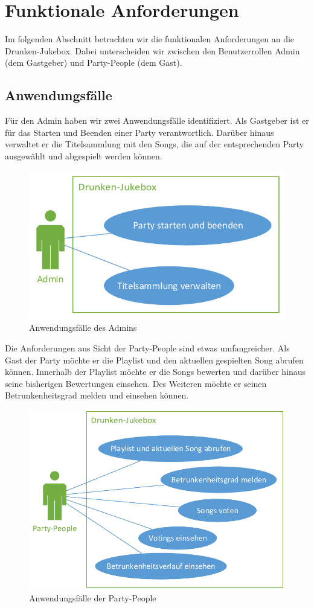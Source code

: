 \section{Funktionale Anforderungen}
Im folgenden Abschnitt betrachten wir die funktionalen Anforderungen an die Drunken-Jukebox. Dabei unterscheiden wir zwischen den Benutzerrollen Admin (dem Gastgeber) und Party-People (dem Gast).  

\subsection{Anwendungsfälle}
Für den Admin haben wir zwei Anwendungsfälle identifiziert. Als Gastgeber ist er für das Starten und Beenden einer Party verantwortlich. Darüber hinaus verwaltet er die Titelsammlung mit den Songs, die auf der entsprechenden Party ausgewählt und abgespielt werden können.

\begin{figure}[H]
\centering
\includegraphics[width=0.75\linewidth]{Bilder/AdminUseCase}
\caption{Anwendungsfälle des Admins}
\label{fig:AdminUseCase}
\end{figure}

Die Anforderungen aus Sicht der Party-People sind etwas umfangreicher. Als Gast der Party möchte er die Playlist und den aktuellen gespielten Song abrufen können. Innerhalb der Playlist möchte er die Songs bewerten und darüber hinaus seine bisherigen Bewertungen einsehen. Des Weiteren möchte er seinen Betrunkenheitsgrad melden und einsehen können.

\begin{figure}[H]
\centering
\includegraphics[width=0.95\linewidth]{Bilder/PartyPeopleUseCase}
\caption{Anwendungsfälle der Party-People}
\label{fig:PartyPeopleUseCase}
\end{figure}
